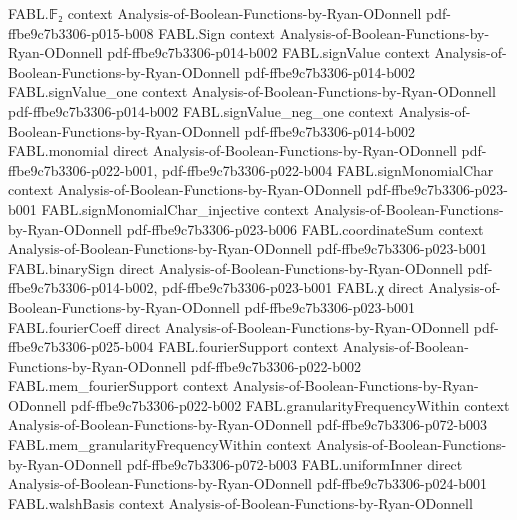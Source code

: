 \begin{theorem}
\label{FABL.size_sort3ReducedDNF}
\leanok
{}
\proofstep
  {FABL.𝔽₂}
  {context}
  {Analysis-of-Boolean-Functions-by-Ryan-ODonnell}
  {pdf-ffbe9c7b3306-p015-b008}
\proofstep
  {FABL.Sign}
  {context}
  {Analysis-of-Boolean-Functions-by-Ryan-ODonnell}
  {pdf-ffbe9c7b3306-p014-b002}
\proofstep
  {FABL.signValue}
  {context}
  {Analysis-of-Boolean-Functions-by-Ryan-ODonnell}
  {pdf-ffbe9c7b3306-p014-b002}
\proofstep
  {FABL.signValue_one}
  {context}
  {Analysis-of-Boolean-Functions-by-Ryan-ODonnell}
  {pdf-ffbe9c7b3306-p014-b002}
\proofstep
  {FABL.signValue_neg_one}
  {context}
  {Analysis-of-Boolean-Functions-by-Ryan-ODonnell}
  {pdf-ffbe9c7b3306-p014-b002}
\proofstep
  {FABL.monomial}
  {direct}
  {Analysis-of-Boolean-Functions-by-Ryan-ODonnell}
  {pdf-ffbe9c7b3306-p022-b001,
    pdf-ffbe9c7b3306-p022-b004}
\proofstep
  {FABL.signMonomialChar}
  {context}
  {Analysis-of-Boolean-Functions-by-Ryan-ODonnell}
  {pdf-ffbe9c7b3306-p023-b001}
\proofstep
  {FABL.signMonomialChar_injective}
  {context}
  {Analysis-of-Boolean-Functions-by-Ryan-ODonnell}
  {pdf-ffbe9c7b3306-p023-b006}
\proofstep
  {FABL.coordinateSum}
  {context}
  {Analysis-of-Boolean-Functions-by-Ryan-ODonnell}
  {pdf-ffbe9c7b3306-p023-b001}
\proofstep
  {FABL.binarySign}
  {direct}
  {Analysis-of-Boolean-Functions-by-Ryan-ODonnell}
  {pdf-ffbe9c7b3306-p014-b002,
    pdf-ffbe9c7b3306-p023-b001}
\proofstep
  {FABL.χ}
  {direct}
  {Analysis-of-Boolean-Functions-by-Ryan-ODonnell}
  {pdf-ffbe9c7b3306-p023-b001}
\proofstep
  {FABL.fourierCoeff}
  {direct}
  {Analysis-of-Boolean-Functions-by-Ryan-ODonnell}
  {pdf-ffbe9c7b3306-p025-b004}
\proofstep
  {FABL.fourierSupport}
  {context}
  {Analysis-of-Boolean-Functions-by-Ryan-ODonnell}
  {pdf-ffbe9c7b3306-p022-b002}
\proofstep
  {FABL.mem_fourierSupport}
  {context}
  {Analysis-of-Boolean-Functions-by-Ryan-ODonnell}
  {pdf-ffbe9c7b3306-p022-b002}
\proofstep
  {FABL.granularityFrequencyWithin}
  {context}
  {Analysis-of-Boolean-Functions-by-Ryan-ODonnell}
  {pdf-ffbe9c7b3306-p072-b003}
\proofstep
  {FABL.mem_granularityFrequencyWithin}
  {context}
  {Analysis-of-Boolean-Functions-by-Ryan-ODonnell}
  {pdf-ffbe9c7b3306-p072-b003}
\proofstep
  {FABL.uniformInner}
  {direct}
  {Analysis-of-Boolean-Functions-by-Ryan-ODonnell}
  {pdf-ffbe9c7b3306-p024-b001}
\proofstep
  {FABL.walshBasis}
  {context}
  {Analysis-of-Boolean-Functions-by-Ryan-ODonnell}

\end{theorem}
